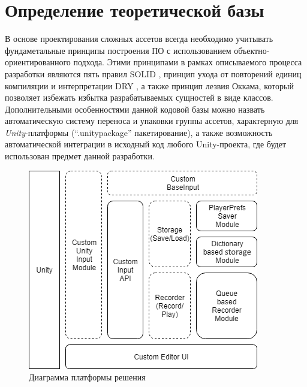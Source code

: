 \section{Определение теоретической базы}
В основе проектирования сложных ассетов всегда необходимо учитывать фундаметальные принципы построения ПО с использованием объектно-ориентированного подхода. Этими принципами в рамках описываемого процесса разработки являются пять правил SOLID \cite{solid}, принцип ухода от повторений единиц компиляции и интерпретации DRY \cite{dry}, а также принцип лезвия Оккама, который позволяет избежать избытка разрабатываемых сущностей в виде классов. Дополнительными особенностями данной кодовой базы можно назвать автоматическую систему переноса и упаковки группы ассетов, характерную для \textit{Unity}-платформы (``.unitypackage'' пакетирование), а также возможность автоматической интеграции в исходный код любого Unity-проекта, где будет использован предмет данной разработки.

\begin{figure}[H]
	\centering
	\includegraphics[width=0.6\linewidth]{platform.png}
	\caption{Диаграмма платформы решения}
	\label{platform}
\end{figure}

